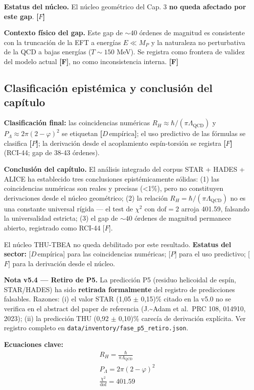﻿\documentclass[11pt,letterpaper]{article}
\begin{document}
\textbf{Estatus del núcleo.} El núcleo geométrico del Cap. 3 \textbf{no queda afectado por este gap}. \textbf{[$F$]}

\textbf{Contexto físico del gap.} Este gap de $\sim 40$ órdenes de magnitud es consistente con la truncación de la EFT a energías $E \ll M_P$ y la naturaleza no perturbativa de la QCD a bajas energías ($T \sim 150$ MeV). Se registra como frontera de validez del modelo actual \textbf{[F]}, no como inconsistencia interna. \textbf{[F]}
\subsection{Clasificación epistémica y conclusión del capítulo}
\textbf{Clasificación final:} las coincidencias numéricas $R_H \approx \hbar/(\pi \Lambda_{\text{QCD}})$ y $P_\Lambda \approx 2\pi(2-\varphi)^2$ se etiquetan \textbf{[$D\,\text{empírica}$]}; el uso predictivo de las fórmulas se clasifica \textbf{[$P$]}; la derivación desde el acoplamiento espín-torsión se registra \textbf{[$F$]} (RCI-44; gap de 38-43 órdenes).

\textbf{Conclusión del capítulo.} El análisis integrado del corpus STAR + HADES + ALICE ha establecido tres conclusiones epistémicamente sólidas: (1) las coincidencias numéricas son reales y precisas (<1\%), pero no constituyen derivaciones desde el núcleo geométrico; (2) la relación $R_H = \hbar/(\pi \Lambda_{\text{QCD}})$ no es una constante universal rígida — el test de $\chi^2$ con $\mathrm{dof} = 2$ arroja 401.59, falsando la universalidad estricta; (3) el gap de $\sim 40$ órdenes de magnitud permanece abierto, registrado como RCI-44 [$F$].

El núcleo THU-TBEA no queda debilitado por este resultado. \textbf{Estatus del sector:} [$D\,\text{empírica}$] para las coincidencias numéricas; [$P$] para el uso predictivo; [$F$] para la derivación desde el núcleo.

\textbf{Nota v5.4 — Retiro de P5.} La predicción P5 (residuo helicoidal de espín, STAR/HADES) ha sido \textbf{retirada formalmente} del registro de predicciones falsables. Razones: (i) el valor STAR (1{,}05 $\pm$ 0{,}15)\% citado en la v5.0 no se verifica en el abstract del paper de referencia (J.\textasciitilde{}Adam et al.\ PRC 108, 014910, 2023); (ii) la predicción THU (0{,}92 $\pm$ 0{,}10)\% carecía de derivación explícita. Ver registro completo en \texttt{data/inventory/fase\_p5\_retiro.json}.

\textbf{Ecuaciones clave:}
\begin{align*}
    R_H = \frac{\hbar}{\pi \Lambda_{\text{QCD}}} \\
    P_\Lambda = 2\pi(2-\varphi)^2 \\
    \frac{\chi^2}{\mathrm{dof}} = 401.59
\end{align*}
\end{document}
